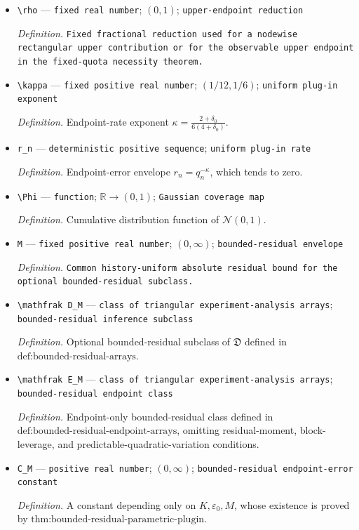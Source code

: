 \documentclass{article}
\begin{document}
\begin{itemize}
  \item \texttt{\textbackslash{}\allowbreak{}rho} --- \texttt{fixed real number}; \((0,1)\); \texttt{upper-\allowbreak{}endpoint reduction}
  \par\smallskip\noindent\emph{Definition.} \texttt{Fixed fractional reduction used for a nodewise rectangular upper contribution or for the observable upper endpoint in the fixed-\allowbreak{}quota necessity theorem.}
  \item \texttt{\textbackslash{}\allowbreak{}kappa} --- \texttt{fixed positive real number}; \((1/12,1/6)\); \texttt{uniform plug-\allowbreak{}in exponent}
  \par\smallskip\noindent\emph{Definition.} Endpoint-rate exponent \(\kappa=\frac{2+\delta_0}{6(4+\delta_0)}\).
  \item \texttt{r\_\allowbreak{}n} --- \texttt{deterministic positive sequence}; \texttt{uniform plug-\allowbreak{}in rate}
  \par\smallskip\noindent\emph{Definition.} Endpoint-error envelope \(r_n=q_n^{-\kappa}\), which tends to zero.
  \item \texttt{\textbackslash{}\allowbreak{}Phi} --- \texttt{function}; \(\mathbb R\to(0,1)\); \texttt{Gaussian coverage map}
  \par\smallskip\noindent\emph{Definition.} Cumulative distribution function of \(\mathcal N(0,1)\).
  \item \texttt{M} --- \texttt{fixed positive real number}; \((0,\infty)\); \texttt{bounded-\allowbreak{}residual envelope}
  \par\smallskip\noindent\emph{Definition.} \texttt{Common history-\allowbreak{}uniform absolute residual bound for the optional bounded-\allowbreak{}residual subclass.}
  \item \texttt{\textbackslash{}\allowbreak{}mathfrak D\_\allowbreak{}M} --- \texttt{class of triangular experiment-\allowbreak{}analysis arrays}; \texttt{bounded-\allowbreak{}residual inference subclass}
  \par\smallskip\noindent\emph{Definition.} Optional bounded-residual subclass of \(\mathfrak D\) defined in \(\text{def:bounded-residual-arrays}\).
  \item \texttt{\textbackslash{}\allowbreak{}mathfrak E\_\allowbreak{}M} --- \texttt{class of triangular experiment-\allowbreak{}analysis arrays}; \texttt{bounded-\allowbreak{}residual endpoint class}
  \par\smallskip\noindent\emph{Definition.} Endpoint-only bounded-residual class defined in \(\text{def:bounded-residual-endpoint-arrays}\), omitting residual-moment, block-leverage, and predictable-quadratic-variation conditions.
  \item \texttt{C\_\allowbreak{}M} --- \texttt{positive real number}; \((0,\infty)\); \texttt{bounded-\allowbreak{}residual endpoint-\allowbreak{}error constant}
  \par\smallskip\noindent\emph{Definition.} A constant depending only on \(K,\varepsilon_0,M\), whose existence is proved by \(\text{thm:bounded-residual-parametric-plugin}\).
\end{itemize}
\end{document}
